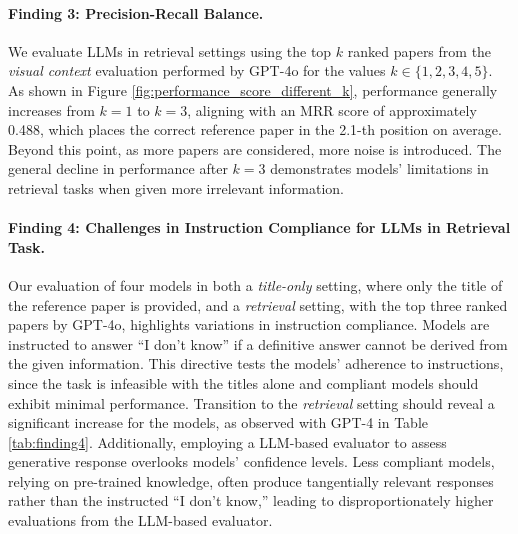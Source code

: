 \paragraph{Finding 3: Precision-Recall Balance.} 
We evaluate LLMs in retrieval settings using the top $k$ ranked papers from the \emph{visual context} evaluation performed by GPT-4o for the values $k \in \{1, 2, 3, 4, 5\}$. 
As shown in Figure \ref{fig:performance_score_different_k}, performance generally increases from $k = 1$ to $k = 3$, aligning with an MRR score of approximately 0.488, which places the correct reference paper in the 2.1-th position on average. Beyond this point, as more papers are considered, more noise is introduced. The general decline in performance after $k = 3$ demonstrates models' limitations in retrieval tasks when given more irrelevant information.






\paragraph{Finding 4: Challenges in Instruction Compliance for LLMs in Retrieval Task.} 
Our evaluation of four models in both a \emph{title-only} setting, where only the title of the reference paper is provided, and a \emph{retrieval} setting, with the top three ranked papers by GPT-4o, highlights variations in instruction compliance. 
Models are instructed to answer ``I don't know'' if a definitive answer cannot be derived from the given information. 
This directive tests the models' adherence to instructions, since the task is infeasible with the titles alone and compliant models should exhibit minimal performance.
Transition to the \emph{retrieval} setting should reveal a significant increase for the models, as observed with GPT-4 in Table \ref{tab:finding4}.
Additionally, employing a LLM-based evaluator to assess generative response overlooks models' confidence levels. Less compliant models, relying on pre-trained knowledge, often produce tangentially relevant responses rather than the instructed ``I don't know,'' leading to disproportionately higher evaluations from the LLM-based evaluator.

